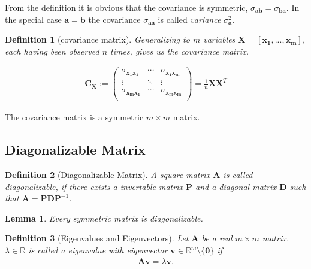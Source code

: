 \documentclass[a4paper]{IEEEtran}
\newtheorem{definition}{Definition}
\newtheorem{lemma}{Lemma}
\begin{document}
From the definition it is obvious that the covariance is symmetric, $\sigma_{\mathbf{ab}} = \sigma_{\mathbf{ba}}$. In the special case $\mathbf{a} = \mathbf{b}$ the covariance $\sigma_{\mathbf{aa}}$ is called \textit{variance} $\sigma_{\mathbf{a}}^2$.

\begin{definition}[covariance matrix]
Generalizing to $m$ variables $\mathbf{X} = [\mathbf{x_1}, ..., \mathbf{x_m}]$, each having been observed $n$ times, gives us the \textit{covariance matrix}.

\begin{align*}
	\mathbf{C_X} := \left(\begin{matrix}
		\sigma_{\mathbf{x_1x_1}}	& \cdots & \sigma_{\mathbf{x_1x_m}}	\\
		\vdots						& \ddots & \vdots					\\
		\sigma_{\mathbf{x_mx_1}}	& \cdots & \sigma_{\mathbf{x_mx_m}}	\\
	\end{matrix}\right) = \frac{1}{n} \mathbf{X}\mathbf{X}^T
\end{align*}
\end{definition}

The covariance matrix is a symmetric $m\times m$ matrix.

\subsection{Diagonalizable Matrix}

\begin{definition}[Diagonalizable Matrix]
	A square matrix $\mathbf{A}$ is called \textit{diagonalizable}, if there exists a invertable matrix $\mathbf{P}$ and a diagonal matrix $\mathbf{D}$ such that $\mathbf{A} = \mathbf{P}\mathbf{D}\mathbf{P}^{-1}$.
\end{definition}

\begin{lemma}
	Every symmetric matrix is diagonalizable.
\end{lemma}

\begin{definition}[Eigenvalues and Eigenvectors]
	Let $\mathbf{A}$ be a real $m\times m$ matrix. $\lambda \in \mathbb{R}$ is called a \textit{eigenvalue} with \textit{eigenvector} $\mathbf{v} \in \mathbb{R}^m\setminus\{\mathbf{0}\}$ if
	\begin{align}
		\label{eq:def_eigenvalue}
		\mathbf{Av} = \lambda \mathbf{v}.
	\end{align}
\end{definition}
\end{document}
